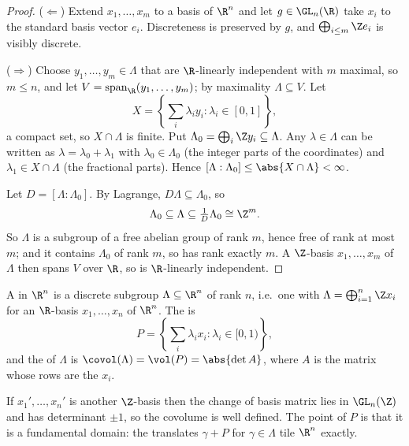 \begin{proof}
	($\Leftarrow$) Extend $x_1, \dots, x_m$ to a basis of $\R^n$ and let $g \in \GL_n(\R)$ take $x_i$ to the standard basis vector $e_i$. Discreteness is preserved by $g$, and $\bigoplus_{i\le m}\Z e_i$ is visibly discrete.

	($\Rightarrow$) Choose $y_1, \dots, y_m \in \Lambda$ that are $\R$-linearly independent with $m$ maximal, so $m \le n$, and let $V = \operatorname{span}_\R(y_1,\dots,y_m)$; by maximality $\Lambda \subseteq V$. Let
	$$X = \left\{\textstyle\sum_i \lambda_iy_i : \lambda_i \in [0,1]\right\},$$
	a compact set, so $X \cap \Lambda$ is finite. Put $\Lambda_0 = \bigoplus_i \Z y_i \subseteq \Lambda$. Any $\lambda \in \Lambda$ can be written as $\lambda = \lambda_0 + \lambda_1$ with $\lambda_0 \in \Lambda_0$ (the integer parts of the coordinates) and $\lambda_1 \in X \cap \Lambda$ (the fractional parts). Hence $[\Lambda : \Lambda_0] \le \abs{X\cap\Lambda} < \infty$.

	Let $D = [\Lambda:\Lambda_0]$. By Lagrange, $D\Lambda \subseteq \Lambda_0$, so
	$$\Lambda_0 \subseteq \Lambda \subseteq \tfrac{1}{D}\Lambda_0 \cong \Z^m.$$
	So $\Lambda$ is a subgroup of a free abelian group of rank $m$, hence free of rank at most $m$; and it contains $\Lambda_0$ of rank $m$, so has rank exactly $m$. A $\Z$-basis $x_1,\dots,x_m$ of $\Lambda$ then spans $V$ over $\R$, so is $\R$-linearly independent.
\end{proof}

\begin{definition}
	A  in $\R^n$ is a discrete subgroup $\Lambda \subseteq \R^n$ of rank $n$, i.e.\ one with $\Lambda = \bigoplus_{i=1}^n \Z x_i$ for an $\R$-basis $x_1,\dots,x_n$ of $\R^n$. The  is
	$$P = \left\{\textstyle\sum_i\lambda_ix_i : \lambda_i \in [0,1)\right\},$$
	and the  of $\Lambda$ is $\covol(\Lambda) = \vol(P) = \abs{\det A}$, where $A$ is the matrix whose rows are the $x_i$.
\end{definition}

If $x_1',\dots,x_n'$ is another $\Z$-basis then the change of basis matrix lies in $\GL_n(\Z)$ and has determinant $\pm1$, so the covolume is well defined. The point of $P$ is that it is a fundamental domain: the translates $\gamma + P$ for $\gamma \in \Lambda$ tile $\R^n$ exactly.

